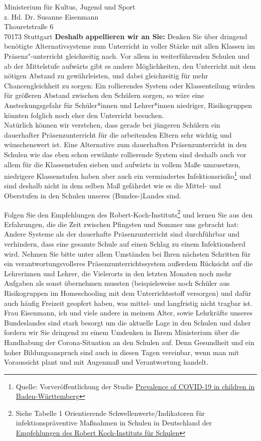 \documentclass[
	fontsize=12pt,
	parskip=full,
	paper=A4,	
	fromalign=right,
	fromemail=true,
	version=last,
]{scrlttr2}
\begin{document}
\begin{letter}{
	Ministerium für Kultus, Jugend und Sport\\
	z. Hd. Dr. Susanne Eisenmann\\
	Thouretstraße 6\\
	70173 Stuttgart 
}
\textbf{Deshalb appellieren wir an Sie:} Denken Sie über dringend benötigte Alternativsysteme zum Unterricht in voller Stärke mit allen Klassen im Präsenz"-unterricht gleichzeitig nach. Vor allem in weiterführenden Schulen und ab der Mittelstufe aufwärts gibt es andere Möglichkeiten, den Unterricht mit dem nötigen Abstand zu gewährleisten, und dabei gleichzeitig für mehr Chancengleichheit zu sorgen: Ein rollierendes System oder Klassenteilung würden für größeren Abstand zwischen den Schülern sorgen, so wäre eine Ansteckungsgefahr für Schüler*innen und Lehrer*innen niedriger, Risikogruppen könnten folglich noch eher den Unterricht besuchen. \\
Natürlich können wir verstehen, dass gerade bei jüngeren Schülern ein dauerhafter Präsenz\-unterricht für die arbeitenden Eltern sehr wichtig und wünschenswert ist. Eine Alternative zum dauerhaften Präsenz\-unterricht in den Schulen wie das eben schon erwähnte rollierende System sind deshalb auch vor allem für die Klassenstufen sieben und aufwärts in vollem Maße umzusetzen, niedrigere Klassenstufen haben aber auch ein vermindertes Infektionsrisiko\footnote{Quelle: Vorveröffentlichung der Studie \href{https://www.klinikum.uni-heidelberg.de/fileadmin/pressestelle/Kinderstudie/Prevalence_of_COVID-19_in_BaWu__.pdf}{\color{blue}\glqq Prevalence of COVID-19 in children in Baden-Württemberg\grqq{}}} und sind deshalb nicht in dem selben Maß gefährdet wie es die Mittel- und Oberstufen in den Schulen unseres (Bundes-)Landes sind.

Folgen Sie den Empfehlungen des Robert-Koch-Instituts\footnote{Siehe Tabelle 1 \glqq Orientierende Schwellenwerte/Indikatoren für infektionspräventive Maßnahmen in Schulen in Deutschland\grqq{} der \href{https://www.rki.de/DE/Content/InfAZ/N/Neuartiges_Coronavirus/Praevention-Schulen.pdf}{\color{blue}Empfehlungen des Robert Koch-Instituts für Schulen}} und lernen Sie aus den Erfahrungen, die die Zeit zwischen Pfingsten und Sommer uns gebracht hat: Andere Systeme als der dauerhafte Präsenzunterricht sind durchführbar und verhindern, dass eine gesamte Schule auf einen Schlag zu einem Infektionsherd wird. Nehmen Sie bitte unter allem Umständen bei Ihren nächsten Schritten für ein verantwortungsvolleres Präsenzunterrichtssystem außerdem Rücksicht auf die Lehrerinnen und Lehrer, die Vielerorts in den letzten Monaten noch mehr Aufgaben als sonst übernehmen mussten (beispielsweise noch Schüler aus Risikogruppen im Homeschooling mit dem Unterrichtsstoff versorgen) und dafür auch häufig Freizeit geopfert haben, was mittel- und langfristig nicht tragbar ist.\\
Frau Eisenmann, ich und viele andere in meinem Alter, sowie Lehrkräfte unseres Bundeslandes sind stark besorgt um die aktuelle Lage in den Schulen und daher fordern wir Sie dringend zu einem Umdenken in Ihrem Ministerium über die Handhabung der Corona-Situation an den Schulen auf.	 Denn Gesundheit und ein hoher Bildungsanspruch sind auch in diesen Tagen vereinbar, wenn man mit Voraussicht plant und mit Augenmaß und Verantwortung handelt. 


\end{letter}
\end{document}
